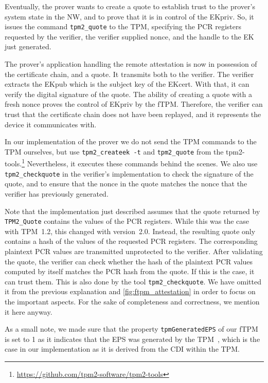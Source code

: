 Eventually, the prover wants to create a quote to establish trust to the prover's system state in the \ac{NW}, and to prove that it is in control of the EKpriv.
So, it issues the command \texttt{tpm2\_quote} to the TPM, specifying the PCR registers requested by the verifier, the verifier supplied nonce, and the handle to the EK just generated.

The prover's application handling the remote attestation is now in possession of the certificate chain, and a quote.
It transmits both to the verifier.
The verifier extracts the EKpub which is the subject key of the EKcert.
With that, it can verify the digital signature of the quote.
The ability of creating a quote with a fresh nonce proves the control of EKpriv by the fTPM\@.
Therefore, the verifier can trust that the certificate chain does not have been replayed, and it represents the device it communicates with.

In our implementation of the prover we do not send the TPM commands to the TPM ourselves, but use \texttt{tpm2\_createek~-t} and \texttt{tpm2\_quote} from the tpm2-tools.\footnote{\url{https://github.com/tpm2-software/tpm2-tools}}
Nevertheless, it executes these commands behind the scenes.
We also use \texttt{tpm2\_checkquote} in the verifier's implementation to check the signature of the quote, and to ensure that the nonce in the quote matches the nonce that the verifier has previously generated.

Note that the implementation just described assumes that the quote returned by \texttt{TPM2\_Quote} contains the values of the PCR registers.
While this was the case with TPM~1.2, this changed with version~2.0.
Instead, the resulting quote only contains a hash of the values of the requested PCR registers.
The corresponding plaintext PCR values are transmitted unprotected to the verifier.
After validating the quote, the verifier can check whether the hash of the plaintext PCR values computed by itself matches the PCR hash from the quote.
If this is the case, it can trust them.
This is also done by the tool \texttt{tpm2\_checkquote}.
We have omitted it from the previous explanation and \autoref{fig:ftpm_attestation} in order to focus on the important aspects.
For the sake of completeness and correctness, we mention it here anyway.

As a small note, we made sure that the property \texttt{tpmGeneratedEPS} of our fTPM is set to 1 as it indicates that the EPS was generated by the TPM~\cite{tpm20}, which is the case in our implementation as it is derived from the CDI within the TPM\@.


